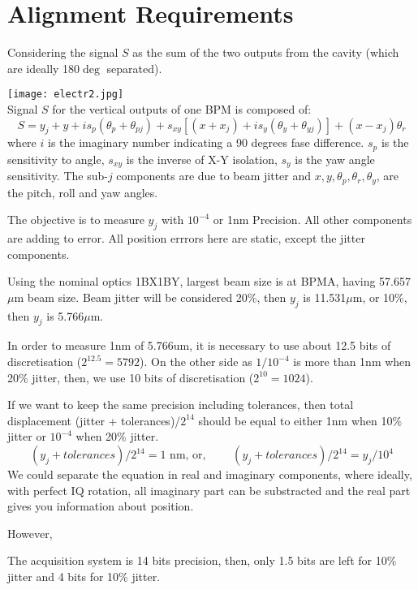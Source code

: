 \section{Alignment Requirements}
Considering the signal $S$ as the sum of the two outputs from the cavity (which are ideally 180$\deg$ separated).\par
\texttt{[image: electr2.jpg]}\\
Signal $S$ for the vertical outputs of one BPM is composed of:
\begin{equation}
S = y_j+y+is_p(\theta_p+\theta_{pj})+s_{xy}[(x+x_j)+is_y(\theta_y+\theta_{yj})]+(x-x_j)\theta_r
\end{equation}
where $i$ is the imaginary number indicating a 90 degrees fase difference. $s_p$ is the sensitivity to angle, $s_{xy}$ is the inverse of X-Y isolation, $s_y$ is the yaw angle sensitivity. The sub-$j$ components are due to beam jitter and $x,y,\theta_p,\theta_r,\theta_y$, are the pitch, roll and yaw angles.

The objective is to measure $y_j$ with $10^{-4}$ or 1nm Precision. All other components are adding to error. All position errrors here are static, except the jitter components.

Using the nominal optics 1BX1BY, largest beam size is at BPMA, having 57.657$\mu$m beam size. Beam jitter will be considered 20\%, then $y_j$ is 11.531$\mu$m, or 10\%, then $y_j$ is 5.766$\mu$m.\par
In order to measure 1nm of 5.766um, it is necessary to use about 12.5 bits of discretisation ($2^{12.5}=5792$). On the other side as $1/10^{-4}$ is more than 1nm when 20\% jitter, then, we use 10 bits of discretisation ($2^{10}=1024$).\par
If we want to keep the same precision including tolerances, then total displacement (jitter + tolerances)/$2^{14}$ should be equal to either 1nm when 10\% jitter or $10^{-4}$ when 20\% jitter.
\begin{equation}
 (y_j+tolerances)/2^{14}=1\text{  nm, or, }\qquad (y_j+tolerances)/2^{14}=y_j/10^4
\end{equation}
We could separate the equation in real and imaginary components, where ideally, with perfect IQ rotation, all imaginary part can be substracted and the real part gives you information about position.\par
However, 


The acquisition system is 14 bits precision, then, only 1.5 bits are left for 10\% jitter and 4 bits for 10\% jitter.
